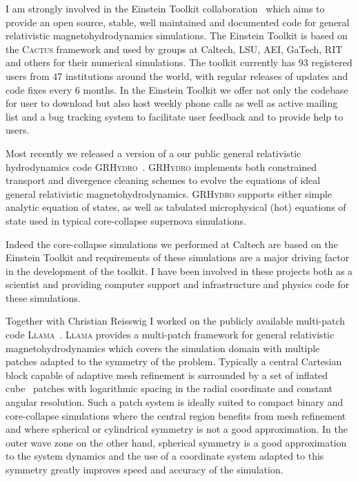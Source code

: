 \documentclass[12pt]{article}
\newcommand{\code}[1]{\textsc{#1}}
\newcommand{\ET}{Einstein Toolkit}
\newcommand{\GRHydro}{\code{GRHydro}}
\begin{document}
I am strongly involved in the \ET{}
collaboration~\cite{2012CQGra..29k5001L} which aims to
provide an open source, stable, well maintained and documented code for 
general relativistic magnetohydrodynamics simulations. The \ET{}
is based on the \code{Cactus} framework and used by groups at Caltech,
LSU, AEI, GaTech, RIT and others for their numerical simulations. The toolkit
currently has 93 registered users from 47 institutions around the world, with
regular releases of updates and code fixes every 6 months.  In the
\ET{} we offer not only the codebase for user to download but also host weekly
phone calls as well as active mailing list and a bug tracking system to
facilitate user feedback and to provide help to users.

Most recently we released a version of a our public general relativistic
hydrodynamics code \GRHydro{}~\cite{2013arXiv1304.5544M}. \GRHydro{}
implements both constrained transport and divergence cleaning schemes to
evolve the equations of ideal general relativistic magnetohydrodynamics.
\GRHydro{} supports either simple analytic equation of states, as well as
tabulated microphysical (hot) equations of state used in typical core-collapse
supernova simulations.

Indeed the core-collapse simulations we performed at Caltech are based on the
\ET{} and requirements of these simulations are a major driving factor in
the development of the toolkit. I have been involved in these projects both as
a scientist and providing computer support and infrastructure and physics code
for these simulations.

Together with Christian Reisswig I worked on the publicly available
multi-patch code \code{Llama}~\cite{Pollney:2009yz}.
\code{Llama} provides a multi-patch framework for general relativistic
magnetohydrodynamics which covers the simulation domain with multiple patches
adapted to the symmetry of the problem. Typically a central Cartesian block
capable of adaptive mesh refinement is surrounded by a set of inflated
cube~\cite{Thornburg:2004dv} patches with logarithmic
spacing in the radial coordinate and constant angular resolution. Such a
patch system is ideally suited to compact binary and core-collapse simulations
where the central region benefits from mesh refinement and where spherical
or cylindrical symmetry is not a good approximation. In the outer wave zone on
the other hand, spherical symmetry is a good approximation to the system
dynamics and the use of a coordinate system adapted to this symmetry greatly
improves speed and accuracy of the simulation. 
\end{document}
